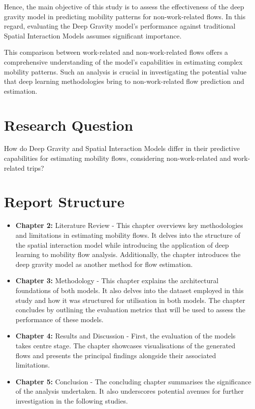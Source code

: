 Hence, the main objective of this study is to assess the effectiveness of the deep gravity model in predicting mobility patterns for non-work-related flows. In this regard, evaluating the Deep Gravity model's performance against traditional Spatial Interaction Models assumes significant importance. 

This comparison between work-related and non-work-related flows offers a comprehensive understanding of the model's capabilities in estimating complex mobility patterns. Such an analysis is crucial in investigating the potential value that deep learning methodologies bring to non-work-related flow prediction and estimation.


    \section{Research Question}    

    How do Deep Gravity and Spatial Interaction Models differ in their predictive capabilities for estimating mobility flows, considering non-work-related and work-related trips?

   

    \section{Report Structure}

    \begin{itemize}
        \item \textbf{Chapter 2:} Literature Review - This chapter overviews key methodologies and limitations in estimating mobility flows. It delves into the structure of the spatial interaction model while introducing the application of deep learning to mobility flow analysis. Additionally, the chapter introduces the deep gravity model as another method for flow estimation. 
        \item \textbf{Chapter 3:} Methodology - This chapter explains the architectural foundations of both models. It also delves into the dataset employed in this study and how it was structured for utilisation in both models. The chapter concludes by outlining the evaluation metrics that will be used to assess the performance of these models.
        \item \textbf{Chapter 4:} Results and Discussion - First, the evaluation of the models takes centre stage. The chapter showcases visualisations of the generated flows and presents the principal findings alongside their associated limitations.
        \item \textbf{Chapter 5:} Conclusion - The concluding chapter summarises the significance of the analysis undertaken. It also underscores potential avenues for further investigation in the following studies.  
    \end{itemize}







